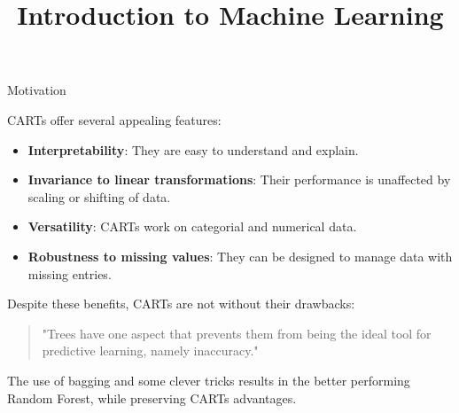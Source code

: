 \documentclass[11pt,compress,t,notes=noshow, xcolor=table]{beamer}
\title{Introduction to Machine Learning}
\institute{\href{https://compstat-lmu.github.io/lecture_i2ml/}{compstat-lmu.github.io/lecture\_i2ml}}
\date{}
\begin{document}
\sloppy

\begin{vbframe}{Motivation}

CARTs offer several appealing features:

\begin{itemize}
  \item \textbf{Interpretability}: They are easy to understand and explain.
  \item \textbf{Invariance to linear transformations}: Their performance is unaffected by scaling or shifting of data.
  \item \textbf{Versatility}: CARTs work on categorial and numerical data.
  \item \textbf{Robustness to missing values}: They can be designed to manage data with missing entries.
\end{itemize}

\vspace{1em}
Despite these benefits, CARTs are not without their drawbacks:
\vspace{1em}

\begin{quotation}
"Trees have one aspect that prevents them from being the ideal tool for predictive learning, namely inaccuracy."
\end{quotation}

\vspace{1em}
The use of bagging and some clever tricks results in the better performing Random Forest,
while preserving CARTs advantages.

\end{vbframe}
\end{document}
